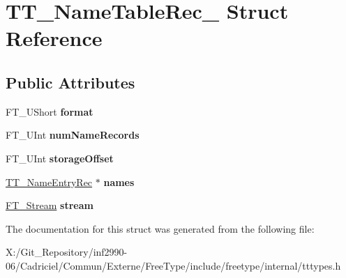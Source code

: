 \hypertarget{struct_t_t___name_table_rec__}{\section{T\-T\-\_\-\-Name\-Table\-Rec\-\_\- Struct Reference}
\label{struct_t_t___name_table_rec__}
}
\subsection*{Public Attributes}
\begin{DoxyCompactItemize}
\item 
\hypertarget{struct_t_t___name_table_rec___a762c5431cbe285cb7153bb5650710fb0}{F\-T\-\_\-\-U\-Short {\bfseries format}}\label{struct_t_t___name_table_rec___a762c5431cbe285cb7153bb5650710fb0}

\item 
\hypertarget{struct_t_t___name_table_rec___a5b565d940b9d02bb69cd19da5cda61b8}{F\-T\-\_\-\-U\-Int {\bfseries num\-Name\-Records}}\label{struct_t_t___name_table_rec___a5b565d940b9d02bb69cd19da5cda61b8}

\item 
\hypertarget{struct_t_t___name_table_rec___a4ed1f4e78e39b2e206411e9ea4d23801}{F\-T\-\_\-\-U\-Int {\bfseries storage\-Offset}}\label{struct_t_t___name_table_rec___a4ed1f4e78e39b2e206411e9ea4d23801}

\item 
\hypertarget{struct_t_t___name_table_rec___a693aed17954386eb8fb5fd7f69d5b551}{\hyperlink{struct_t_t___name_entry_rec__}{T\-T\-\_\-\-Name\-Entry\-Rec} $\ast$ {\bfseries names}}\label{struct_t_t___name_table_rec___a693aed17954386eb8fb5fd7f69d5b551}

\item 
\hypertarget{struct_t_t___name_table_rec___a97109aec8cd7ca13f6627f3fee15d48d}{\hyperlink{struct_f_t___stream_rec__}{F\-T\-\_\-\-Stream} {\bfseries stream}}\label{struct_t_t___name_table_rec___a97109aec8cd7ca13f6627f3fee15d48d}

\end{DoxyCompactItemize}


The documentation for this struct was generated from the following file\-:\begin{DoxyCompactItemize}
\item 
X\-:/\-Git\-\_\-\-Repository/inf2990-\/06/\-Cadriciel/\-Commun/\-Externe/\-Free\-Type/include/freetype/internal/tttypes.\-h\end{DoxyCompactItemize}
